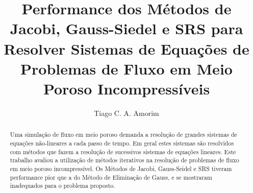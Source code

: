 \documentclass[final,5p]{elsarticle}
\numberwithin{equation}{section}
\begin{document}
\begin{frontmatter}



\title{Performance dos Métodos de Jacobi, Gauss-Siedel e SRS para Resolver Sistemas de Equações de Problemas de Fluxo em Meio Poroso Incompressíveis}


\author{Tiago C. A. Amorim}

\begin{abstract}

        Uma simulação de fluxo em meio poroso demanda a resolução de grandes sistemas de equações não-lineares a cada passo de tempo. Em geral estes sistemas são resolvidos com métodos que fazem a resolução de sucessivos sistemas de equações lineares. Este trabalho avaliou a utilização de métodos iterativos na resolução de problemas de fluxo em meio poroso incompressível. Os Métodos de Jacobi, Gauss-Seidel e SRS tiveram performance pior que a do Método de Eliminação de Gauss, e se mostraram inadequados para o problema proposto.


\end{abstract}
\end{frontmatter}
\end{document}
